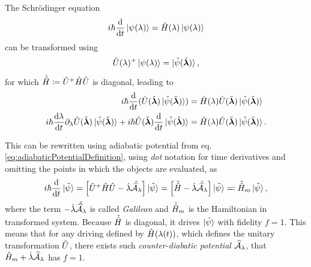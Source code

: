 The Schrödinger equation
\begin{equation}
    i\hbar \der{}{t}\ket{\psi(\lambda)} = \HH(\lambda)\ket{\psi(\lambda)}
\end{equation}
can be transformed using 
\begin{equation}
    \U(\lambda)^+  \ket{\psi(\lambda)} = \ket{\tilde\psi(\tilde\llambda)},
    \label{eq:transformationUtimeDependentH}
\end{equation}
for which $\tilde\HH\coloneqq\U^+\HH\U$ is diagonal, leading to
\begin{align}
    i\hbar \der{}{t}(\U(\tilde\llambda)\ket{\tilde \psi(\tilde\llambda)}) &= \HH(\lambda)\U(\tilde\llambda)\ket{\tilde \psi(\tilde\llambda)} \\
    i\hbar \der{\lambda}{t}\partial_\lambda\U(\tilde\llambda)\ket{\tilde \psi(\tilde\llambda)} + i\hbar \U(\tilde\llambda)\der{}{t}\ket{\tilde \psi(\tilde\llambda)} &= \HH(\lambda)\U(\tilde\llambda)\ket{\tilde \psi(\tilde\llambda)}.
\end{align}

This can be rewritten using adiabatic potential from eq. \ref{eq:adiabaticPotentialDefinition}, using \emph{dot} notation for time derivatives and omitting the points in which the objects are evaluated, as
\begin{equation}
    i\hbar \der{}{t}\ket{\tilde\psi} = \left[\U^+\HH\U-\dot{\lambda}\tilde{\AA_\lambda}\right]\ket{\tilde\psi} = \left[\tilde \HH-\dot{\lambda}\tilde{\AA_\lambda}\right]\ket{\tilde{\psi}} \eqqcolon \tilde{\HH}_m \ket{\tilde{\psi}},
\end{equation}
where the term $-\dot{\lambda}\tilde{\AA_\lambda}$ is called \emph{Galilean} and $ \tilde{\HH}_m$ is the Hamiltonian in transformed system. Because $\tilde{\HH}$ is diagonal, it drives $\ket{\tilde{\psi}}$ with fidelity $f=1$. This means that for any driving defined by $\HH(\lambda(t))$, which defines the unitary transformation $\U$, there exists such \emph{counter-diabatic potential} $\AA_\lambda$, that $\HH_m + \dot{\lambda}\AA_\lambda$ has $f=1$.



